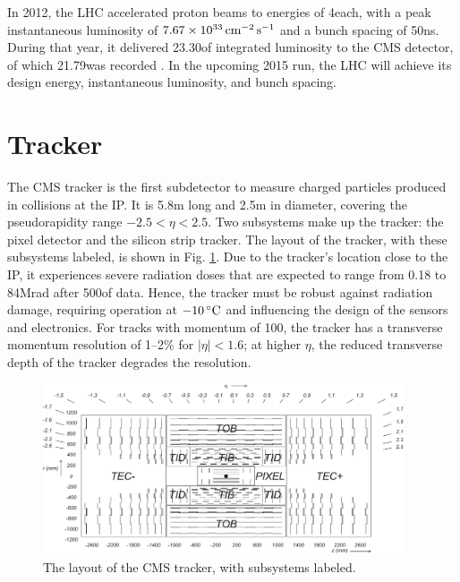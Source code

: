 In 2012, the LHC accelerated proton beams to energies of 4\TeV each, with a peak instantaneous luminosity of $7.67\times10^{33}\,\text{cm}^\text{$-$2}\,\text{s}^\text{$-$1}$ and a bunch spacing of 50\unit{ns}. During that year, it delivered 23.30\fbinv of integrated luminosity to the CMS detector, of which 21.79\fbinv was recorded \cite{LumiPublic}. In the upcoming 2015 run, the LHC will achieve its design energy, instantaneous luminosity, and bunch spacing.

\section{Tracker}
\label{sec:tracker}

The CMS tracker is the first subdetector to measure charged particles produced in collisions at the IP. It is 5.8\unit{m} long and 2.5\unit{m} in diameter, covering the pseudorapidity range $-2.5 < \eta < 2.5$. Two subsystems make up the tracker: the pixel detector and the silicon strip tracker. The layout of the tracker, with these subsystems labeled, is shown in Fig. \ref{fig:tk-layout}. Due to the tracker's location close to the IP, it experiences severe radiation doses that are expected to range from 0.18 to 84\unit{Mrad} after 500\fbinv of data. Hence, the tracker must be robust against radiation damage, requiring operation at $-10\,^\circ\text{C}$ and influencing the design of the sensors and electronics. For tracks with momentum of 100\GeV, the tracker has a transverse momentum resolution of 1--2\% for $|\eta|<1.6$; at higher $\eta$, the reduced transverse depth of the tracker degrades the resolution.

\begin{figure}[hbt]
\begin{center}
\includegraphics[width=0.95\textwidth]{figures/CMS_tracker.pdf}
\caption{The layout of the CMS tracker, with subsystems labeled.}
\label{fig:tk-layout}
\end{center}
\end{figure}

